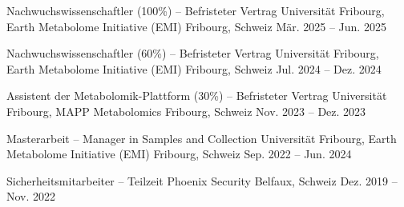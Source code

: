 

\begin{cventries}


\cventry
  {Nachwuchswissenschaftler (100\%) – Befristeter Vertrag} %
  {Universität Fribourg, Earth Metabolome Initiative (EMI)} %
  {Fribourg, Schweiz} %
  {Mär. 2025 -- Jun. 2025} %
  {}

\cventry
  {Nachwuchswissenschaftler (60\%) – Befristeter Vertrag} %
  {Universität Fribourg, Earth Metabolome Initiative (EMI)} %
  {Fribourg, Schweiz} %
  {Jul. 2024 -- Dez. 2024} %
  {}

\cventry
  {Assistent der Metabolomik-Plattform (30\%) – Befristeter Vertrag} %
  {Universität Fribourg, MAPP Metabolomics} %
  {Fribourg, Schweiz} %
  {Nov. 2023 -- Dez. 2023} %
  {}

\cventry
  {Masterarbeit – Manager in Samples and Collection} %
  {Universität Fribourg, Earth Metabolome Initiative (EMI)} %
  {Fribourg, Schweiz} %
  {Sep. 2022 -- Jun. 2024} %
  {}

\cventry
  {Sicherheitsmitarbeiter – Teilzeit} %
  {Phoenix Security} %
  {Belfaux, Schweiz} %
  {Dez. 2019 -- Nov. 2022} %
  {}

\end{cventries}
